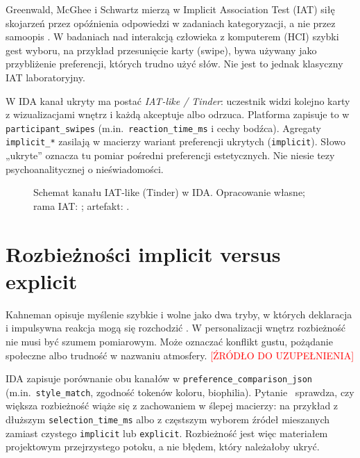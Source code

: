 Greenwald, McGhee i Schwartz mierzą w Implicit Association Test (IAT) siłę skojarzeń przez opóźnienia odpowiedzi w zadaniach kategoryzacji, a nie przez samoopis \parencite{greenwald1998iat}.
W badaniach nad interakcją człowieka z komputerem (HCI) szybki gest wyboru, na przykład przesunięcie karty (swipe), bywa używany jako przybliżenie preferencji, których trudno użyć słów. Nie jest to jednak klasyczny IAT laboratoryjny.

W IDA kanał ukryty ma postać \emph{IAT-like / Tinder}: uczestnik widzi kolejno karty z wizualizacjami wnętrz i każdą akceptuje albo odrzuca. Platforma zapisuje to w \texttt{participant\_swipes} (m.in.\ \texttt{reaction\_time\_ms} i cechy bodźca).
Agregaty \texttt{implicit\_*} zasilają w macierzy wariant preferencji ukrytych (\texttt{implicit}).
Słowo „ukryte” oznacza tu pomiar pośredni preferencji estetycznych. Nie niesie tezy psychoanalitycznej o nieświadomości.

\begin{figure}[htbp]
  \centering
  \caption{Schemat kanału IAT-like (Tinder) w IDA.
    Opracowanie własne; rama IAT: \textcite{greenwald1998iat}; artefakt: \parencite{idaPlatform2026}.}
  \label{fig:ch03:tinder-iat}
\end{figure}

\section{Rozbieżności implicit versus explicit}
\label{ch03:sec:rozbieznosci}

Kahneman opisuje myślenie szybkie i wolne jako dwa tryby, w których deklaracja i impulsywna reakcja mogą się rozchodzić \parencite{kahneman2011thinking}.
W personalizacji wnętrz rozbieżność nie musi być szumem pomiarowym. Może oznaczać konflikt gustu, pożądanie społeczne albo trudność w nazwaniu atmosfery. \textcolor{red}{[ŹRÓDŁO DO UZUPEŁNIENIA]}

IDA zapisuje porównanie obu kanałów w \texttt{preference\_comparison\_json} (m.in.\ \texttt{style\_match}, zgodność tokenów koloru, biophilia).
Pytanie~ sprawdza, czy większa rozbieżność wiąże się z zachowaniem w ślepej macierzy: na przykład z dłuższym \texttt{selection\_time\_ms} albo z częstszym wyborem źródeł mieszanych zamiast czystego \texttt{implicit} lub \texttt{explicit}.
Rozbieżność jest więc materiałem projektowym przejrzystego potoku, a nie błędem, który należałoby ukryć.

